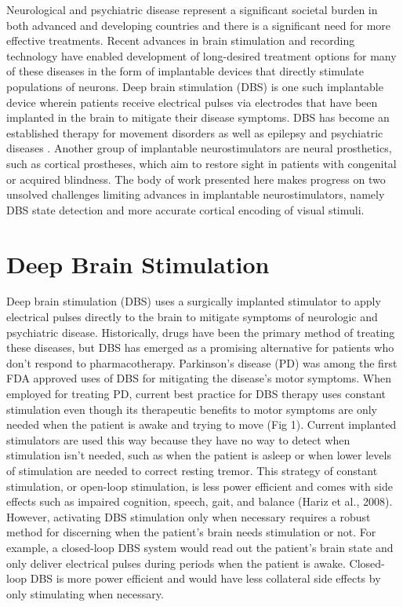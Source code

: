 \documentclass{templates/ucdenverthesis}
\begin{document}
Neurological and psychiatric disease represent a significant societal burden in both advanced and developing countries \autocite{Collins:2011ja} and there is a significant need for more effective treatments.
Recent advances in brain stimulation and recording technology have enabled development of long-desired treatment options for many of these diseases in the form of implantable devices that directly stimulate populations of neurons.
Deep brain stimulation (DBS) is one such implantable device wherein patients receive electrical pulses via electrodes that have been implanted in the brain to mitigate their disease symptoms.
DBS has become an established therapy for movement disorders \autocite{Perlmutter:2006kp} as well as epilepsy and psychiatric diseases \autocite{Holtzheimer:2011eq}.
Another group of implantable neurostimulators are neural prosthetics, such as cortical prostheses, which aim to restore sight in patients with congenital or acquired blindness. The body of work presented here makes progress on two unsolved challenges limiting advances in implantable neurostimulators, namely DBS state detection and more accurate cortical encoding of visual stimuli.

\hypertarget{sec:dbs}{%
\section{Deep Brain Stimulation}\label{sec:dbs}}

Deep brain stimulation (DBS) uses a surgically implanted stimulator to apply electrical pulses directly to the brain to mitigate symptoms of neurologic and psychiatric disease. Historically, drugs have been the primary method of treating these diseases, but DBS has emerged as a promising alternative for patients who don't respond to pharmacotherapy. Parkinson's disease (PD) was among the first FDA approved uses of DBS for mitigating the disease's motor symptoms. When employed for treating PD, current best practice for DBS therapy uses constant stimulation even though its therapeutic benefits to motor symptoms are only needed when the patient is awake and trying to move (Fig 1). Current implanted stimulators are used this way because they have no way to detect when stimulation isn't needed, such as when the patient is asleep or when lower levels of stimulation are needed to correct resting tremor. This strategy of constant stimulation, or open-loop stimulation, is less power efficient and comes with side effects such as impaired cognition, speech, gait, and balance (Hariz et al., 2008). However, activating DBS stimulation only when necessary requires a robust method for discerning when the patient's brain needs stimulation or not. For example, a closed-loop DBS system would read out the patient's brain state and only deliver electrical pulses during periods when the patient is awake. Closed-loop DBS is more power efficient and would have less collateral side effects by only stimulating when necessary.
\end{document}
